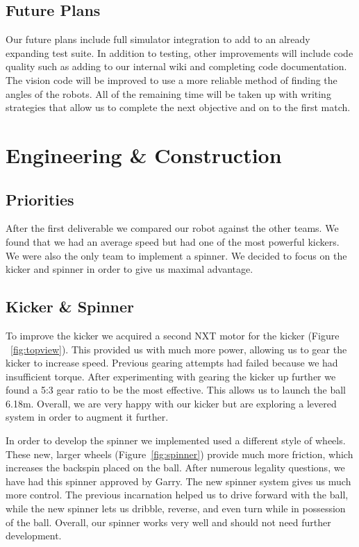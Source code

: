 \documentclass[12pt, a4paper, titlepage]{article}
\begin{document}
\subsection{Future Plans}

Our future plans include full simulator integration to add to an already
expanding test suite. In addition to testing, other improvements will
include code quality such as adding to our internal wiki and completing code
documentation. The vision code will be improved to use a more reliable method
of finding the angles of the robots. All of the remaining time will be taken up
with writing strategies that allow us to complete the next objective and on to
the first match.

\section{Engineering \& Construction}

\subsection{Priorities}

After the first deliverable we compared our robot against the other teams. We
found that we had an average speed but had one of the most powerful kickers.
We were also the only team to implement a spinner. We decided to focus on the
kicker and spinner in order to give us maximal advantage.

\subsection{Kicker \& Spinner}

To improve the kicker we acquired a second NXT motor for the kicker (Figure
~\ref{fig:topview}). This provided us with much more power, allowing us to gear
the kicker to increase speed. Previous gearing attempts had failed because we
had insufficient torque. After experimenting with gearing the kicker up further
we found a 5:3 gear ratio to be the most effective. This allows us to launch the
ball 6.18m. Overall, we are very happy with our kicker but are exploring a
levered system in order to augment it further.

In order to develop the spinner we implemented used a different style of wheels.
These new, larger wheels (Figure~\ref{fig:spinner}) provide much more friction,
which increases the backspin placed on the ball. After numerous legality
questions, we have had this spinner approved by Garry. The new spinner system
gives us much more control. The previous incarnation helped us to drive forward
with the ball, while the new spinner lets us dribble, reverse, and even turn
while in possession of the ball. Overall, our spinner works very well and should
not need further development.
\end{document}
